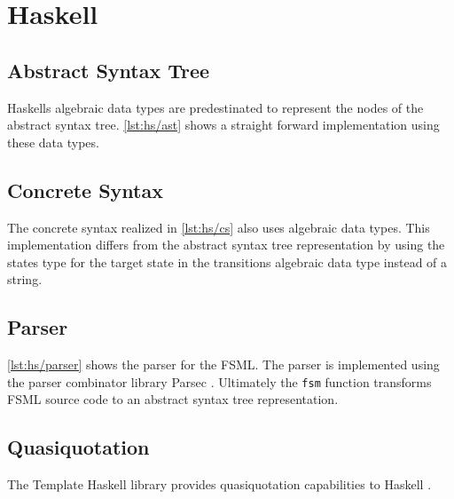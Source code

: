 \section{Haskell}
\label{s:haskell}

\subsection{Abstract Syntax Tree}

Haskells algebraic data types are predestinated to represent the nodes of the abstract syntax tree.
\autoref{lst:hs/ast} shows a straight forward implementation using these data types.



\subsection{Concrete Syntax}

The concrete syntax realized in \autoref{lst:hs/cs} also uses algebraic data types.
This implementation differs from the abstract syntax tree representation by using the states type for the target state in the transitions algebraic data type instead of a string.



\subsection{Parser}
\label{hs:ss/parser}

\autoref{lst:hs/parser} shows the parser for the FSML.
The parser is implemented using the parser combinator library Parsec \cite{parsec}.
Ultimately the \lstinline[language=haskell]{fsm} function transforms FSML source code to an abstract syntax tree representation.



\subsection{Quasiquotation}
\label{ss:haskell/quasiquotation}
The Template Haskell library provides quasiquotation capabilities to Haskell \cite{templatehaskell}.

